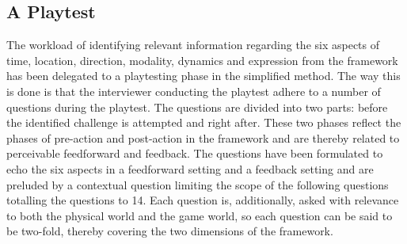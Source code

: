 \subsection{A Playtest}
The workload of identifying relevant information regarding the six aspects of time, location, direction, modality, dynamics and expression from the framework has been delegated to a playtesting phase in the simplified method. The way this is done is that the interviewer conducting the playtest adhere to a number of questions during the playtest. The questions are divided into two parts: before the identified challenge is attempted and right after. These two phases reflect the phases of pre-action and post-action in the framework and are thereby related to perceivable feedforward and feedback. The questions have been formulated to echo the six aspects in a feedforward setting and a feedback setting and are preluded by a contextual question limiting the scope of the following questions totalling the questions to 14. Each question is, additionally, asked with relevance to both the physical world and the game world, so each question can be said to be two-fold, thereby covering the two dimensions of the framework.

